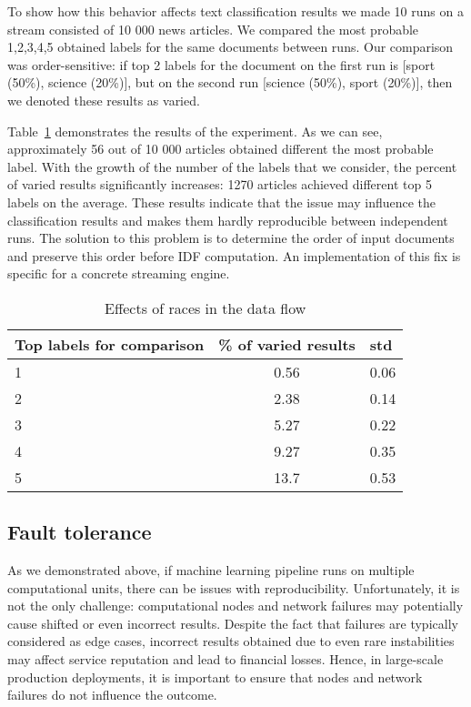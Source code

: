To show how this behavior affects text classification results we made 10 runs on a stream consisted of 10 000 news articles. We compared the most probable 1,2,3,4,5 obtained labels for the same documents between runs. Our comparison was order-sensitive: if top 2 labels for the document on the first run is [sport (50\%), science (20\%)], but on the second run [science (50\%), sport (20\%)], then we denoted these results as varied. 

Table~\ref{race_table} demonstrates the results of the experiment. As we can see, approximately 56 out of 10 000 articles obtained different the most probable label. With the growth of the number of the labels that we consider, the percent of varied results significantly increases: 1270 articles achieved different top 5 labels on the average. These results indicate that the issue may influence the classification results and makes them hardly reproducible between independent runs. The solution to this problem is to determine the order of input documents and preserve this order before IDF computation. An implementation of this fix is specific for a concrete streaming engine.

\begin{table}[htbp]
\caption{Effects of races in the data flow}
\begin{threeparttable}
\begin{tabular}{lcl}
Top labels for comparison    & \% of varied results & std    \\
\hline
1   &   0.56    &   0.06    \\
2   &   2.38    &   0.14    \\
3   &   5.27    &   0.22    \\
4   &   9.27    &   0.35    \\
5   &   13.7    &   0.53    \\
\end{tabular}
\end{threeparttable}
\label{race_table}
\end{table}

\subsection{Fault tolerance}

As we demonstrated above, if machine learning pipeline runs on multiple computational units, there can be issues with reproducibility. Unfortunately, it is not the only challenge: computational nodes and network failures may potentially cause shifted or even incorrect results. Despite the fact that failures are typically considered as edge cases, incorrect results obtained due to even rare instabilities may affect service reputation and lead to financial losses. Hence, in large-scale production deployments, it is important to ensure that nodes and network failures do not influence the outcome.

